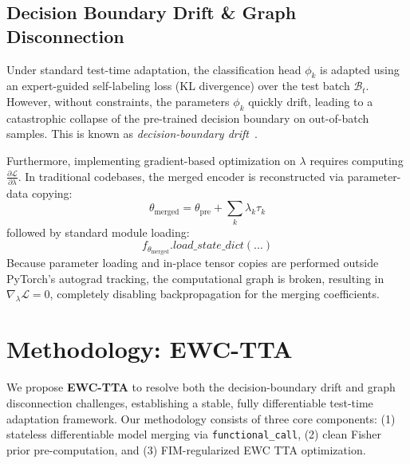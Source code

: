 \documentclass{article}
\theoremstyle{plain}
\theoremstyle{definition}
\theoremstyle{remark}
\begin{document}
\subsection{Decision Boundary Drift \& Graph Disconnection}
Under standard test-time adaptation, the classification head $\phi_k$ is adapted using an expert-guided self-labeling loss (KL divergence) over the test batch $\mathcal{B}_t$. However, without constraints, the parameters $\phi_k$ quickly drift, leading to a catastrophic collapse of the pre-trained decision boundary on out-of-batch samples. This is known as \textit{decision-boundary drift}~\citep{symerge2026sbf, sata2026sata}.

Furthermore, implementing gradient-based optimization on $\lambda$ requires computing $\frac{\partial \mathcal{L}}{\partial \lambda}$. In traditional codebases, the merged encoder is reconstructed via parameter-data copying:
\begin{equation}
    \theta_{\text{merged}} = \theta_{\text{pre}} + \sum_k \lambda_k \tau_k
\end{equation}
followed by standard module loading:
\begin{equation}
    f_{\theta_{\text{merged}}}.load\_state\_dict(\dots)
\end{equation}
Because parameter loading and in-place tensor copies are performed outside PyTorch's autograd tracking, the computational graph is broken, resulting in $\nabla_\lambda \mathcal{L} = 0$, completely disabling backpropagation for the merging coefficients.

\section{Methodology: EWC-TTA}
\label{submission-method}

We propose \textbf{EWC-TTA} to resolve both the decision-boundary drift and graph disconnection challenges, establishing a stable, fully differentiable test-time adaptation framework. Our methodology consists of three core components: (1) stateless differentiable model merging via \texttt{functional\_call}, (2) clean Fisher prior pre-computation, and (3) FIM-regularized EWC TTA optimization.
\end{document}
